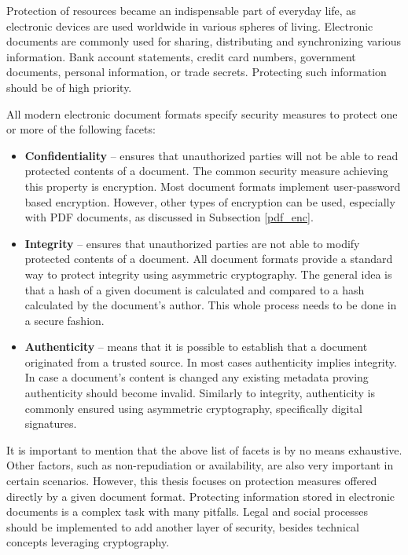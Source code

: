 \documentclass[11pt,oneside]{fithesis2}
\begin{document}
Protection of resources became an indispensable part of everyday life, as electronic devices are used worldwide in various spheres of living. Electronic documents are commonly used for sharing, distributing and synchronizing various information. Bank account statements, credit card numbers, government documents, personal information, or trade secrets. Protecting such information should be of high priority.

All modern electronic document formats specify security measures to protect one or more of the following facets:

\begin{itemize}
\setlength\itemsep{0.1em}
\item{\textbf{Confidentiality} -- ensures that unauthorized parties will not be able to read protected contents of a document. The common security measure achieving this property is encryption. Most document formats implement user-password based encryption. However, other types of encryption can be used, especially with PDF documents, as discussed in Subsection \ref{pdf_enc}.}
\item{\textbf{Integrity} -- ensures that unauthorized parties are not able to modify protected contents of a document. All document formats provide a standard way to protect integrity using asymmetric cryptography. The general idea is that a hash of a given document is calculated and compared to a hash calculated by the document's author. This whole process needs to be done in a secure fashion.}
\item{\textbf{Authenticity} -- means that it is possible to establish that a document originated from a trusted source. In most cases authenticity implies integrity. In case a document's content is changed any existing metadata proving authenticity should become invalid. Similarly to integrity, authenticity is commonly ensured using asymmetric cryptography, specifically digital signatures.}
\end{itemize}

It is important to mention that the above list of facets is by no means exhaustive. Other factors, such as non-repudiation or availability, are also very important in certain scenarios. However, this thesis focuses on protection measures offered directly by a given document format. Protecting information stored in electronic documents is a complex task with many pitfalls. Legal and social processes should be implemented to add another layer of security, besides technical concepts leveraging cryptography.  
\end{document}
